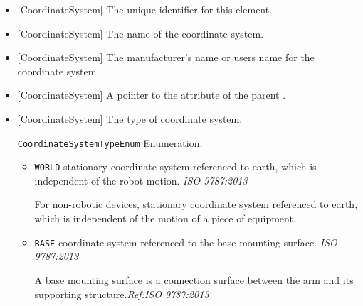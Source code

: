 \begin{itemize}

\item {}[CoordinateSystem] \newline The unique identifier for this element.

\item {}[CoordinateSystem] \newline The name of the coordinate system.

\item {}[CoordinateSystem] \newline The manufacturer's name or users name for the coordinate system.

\item {}[CoordinateSystem] \newline A pointer to the  attribute of the parent .

\item {}[CoordinateSystem] \newline The type of coordinate system.

\texttt{CoordinateSystemTypeEnum} Enumeration:

\begin{itemize}
\item \texttt{WORLD} \newline stationary coordinate system referenced to earth, which is independent of the robot motion. \textit{ISO 9787:2013}

For non-robotic devices, stationary coordinate system referenced to earth, which is independent of the motion of a piece of equipment. 
\item \texttt{BASE} \newline coordinate system referenced to the base mounting surface. \textit{ISO 9787:2013}

A base mounting surface is a connection surface between the arm and its supporting structure.\textit{Ref:ISO 9787:2013}


\end{itemize}
\end{itemize}
